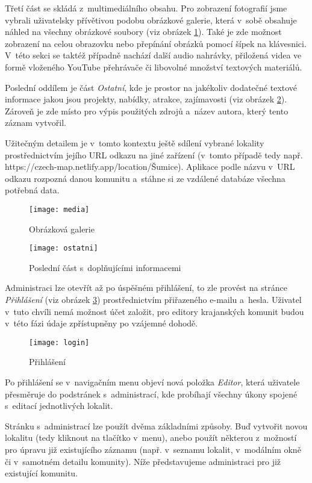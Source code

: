 Třetí část se skládá z~multimediálního obsahu. Pro zobrazení fotografií jsme vybrali uživatelsky přívětivou podobu obrázkové galerie, která v~sobě obsahuje náhled na všechny obrázkové soubory (viz obrázek \ref{media}). Také je zde možnost zobrazení na celou obrazovku nebo přepínání obrázků pomocí šípek na klávesnici. V~této sekci se taktéž případně nachází další audio nahrávky, přiložená videa ve formě vloženého YouTube přehrávače či libovolné množství textových materiálů.

Poslední oddílem je část \emph{Ostatní}, kde je prostor na jakékoliv dodatečné textové informace jakou jsou projekty, nabídky, atrakce, zajímavosti (viz obrázek \ref{ostatni}). Zároveň je zde místo pro výpis použitých zdrojů a~název autora, který tento záznam vytvořil.

Užitečným detailem je v~tomto kontextu ještě sdílení vybrané lokality prostřednictvím jejího URL odkazu na jiné zařízení (v~tomto případě tedy např. https://czech-map.netlify.app/location/Šumice). Aplikace podle názvu v~URL odkazu rozpozná danou komunitu a~stáhne si ze vzdálené databáze všechna potřebná data.

\begin{figure}  
    \centering
    \texttt{[image: media]}  
    \caption{Obrázková galerie}
    \label{media}
\end{figure}

\begin{figure} 
    \centering
    \texttt{[image: ostatni]}  
    \caption{Poslední část s~doplňujícími informacemi}
    \label{ostatni}
\end{figure}

Administraci lze otevřít až po úspěšném přihlášení, to zle provést na stránce \emph{Přihlášení} (viz obrázek \ref{login}) prostřednictvím přiřazeného e-mailu a~hesla. Uživatel v~tuto chvíli nemá možnost účet založit, pro editory krajanských komunit budou v~této fázi údaje zpřístupněny po vzájemné dohodě.

\begin{figure}
    \centering
    \texttt{[image: login]}  
    \caption{Přihlášení}
    \label{login}
\end{figure}

Po přihlášení se v~navigačním menu objeví nová položka \emph{Editor}, která uživatele přesměruje do podstránek s~administrací, kde probíhají všechny úkony spojené s~editací jednotlivých lokalit.

Stránku s~administrací lze použít dvěma základními způsoby. Buď vytvořit novou lokalitu (tedy kliknout na tlačítko v~menu), anebo použít některou z~možností pro úpravu již existujícího záznamu (např. v~seznamu lokalit, v~modálním okně či v~samotném detailu komunity). Níže představujeme administraci pro již existující komunitu.

